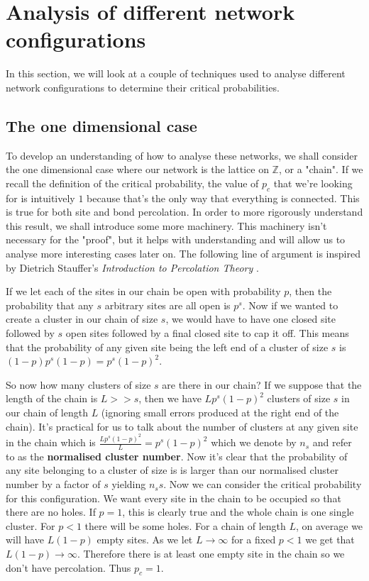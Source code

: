 \section{Analysis of different network configurations}
In this section, we will look at a couple of techniques used to analyse different network configurations to determine their critical probabilities.

\subsection{The one dimensional case}
To develop an understanding of how to analyse these networks, we shall consider the one dimensional case where our network is the lattice on $\mathbb{Z}$, or a "chain".
If we recall the definition of the critical probability, the value of $p_c$ that we're looking for is intuitively $1$ because that's the only way that everything is connected. This
is true for both site and bond percolation. In
order to more rigorously understand this result, we shall introduce some more
machinery. This machinery isn't necessary for the "proof", but it helps with understanding and will allow us to analyse more interesting cases later on. The following line of
argument is inspired by Dietrich Stauffer's \textit{Introduction to Percolation Theory} \cite{Stauffer}.

If we let each of the sites in our chain be open with probability $p$, then the probability that any $s$ arbitrary sites are all open is $p^s$. Now if we wanted to create a cluster
in our chain of size $s$, we would have to have one closed site followed by $s$ open sites followed by a final closed site to cap it off. This means that the probability of any
given site being the left end of a cluster of size $s$ is $(1-p)p^s(1-p) = p^s(1-p)^2$.

So now how many clusters of size $s$ are there in our chain? If we suppose that the length of the chain is $L >> s$, then we have $Lp^s(1-p)^2$ clusters of size $s$ in our chain of
length $L$ (ignoring small errors produced at the right end of the chain). It's practical for us to talk about the number of clusters at any given site in the chain which is
$\frac{Lp^s(1-p)^2}{L} = p^s(1-p)^2$ which we denote by $n_s$ and refer to as the \textbf{normalised cluster number}. Now it's clear that the probability of any site belonging to a
cluster of size is is larger than our normalised cluster number by a factor of $s$ yielding $n_ss$. Now we can consider the critical probability for this configuration. We want
every site in the chain to be occupied so that there are no holes. If $p = 1$, this is clearly true and the whole chain is one single cluster. For $p < 1$ there will be some holes.
For a chain of length $L$, on average we will have $L(1-p)$ empty sites. As we let $L \rightarrow \infty$ for a fixed $p < 1$ we get that $L(1-p) \rightarrow \infty$. Therefore
there is at least one empty site in the chain so we don't have percolation. Thus $p_c = 1$.

